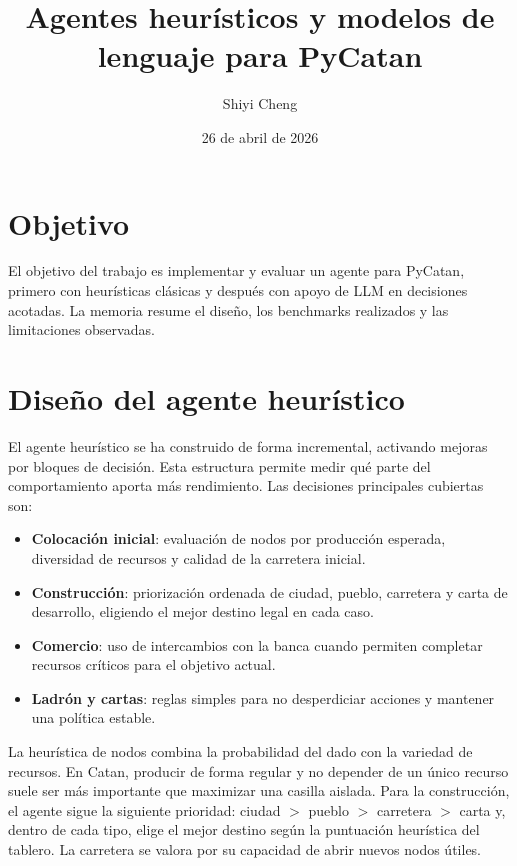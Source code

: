﻿\documentclass[10pt,a4paper]{article}
\title{Agentes heurísticos y modelos de lenguaje para PyCatan}
\author{Shiyi Cheng}
\date{26 de abril de 2026}
\begin{document}
\maketitle

\section{Objetivo}
El objetivo del trabajo es implementar y evaluar un agente para PyCatan, primero con heurísticas clásicas y después con apoyo de LLM en decisiones acotadas. La memoria resume el diseño, los benchmarks realizados y las limitaciones observadas.

\section{Diseño del agente heurístico}
El agente heurístico se ha construido de forma incremental, activando mejoras por bloques de decisión. Esta estructura permite medir qué parte del comportamiento aporta más rendimiento. Las decisiones principales cubiertas son:

\begin{itemize}
\item \textbf{Colocación inicial}: evaluación de nodos por producción esperada, diversidad de recursos y calidad de la carretera inicial.
\item \textbf{Construcción}: priorización ordenada de ciudad, pueblo, carretera y carta de desarrollo, eligiendo el mejor destino legal en cada caso.
\item \textbf{Comercio}: uso de intercambios con la banca cuando permiten completar recursos críticos para el objetivo actual.
\item \textbf{Ladrón y cartas}: reglas simples para no desperdiciar acciones y mantener una política estable.
\end{itemize}

La heurística de nodos combina la probabilidad del dado con la variedad de recursos. En Catan, producir de forma regular y no depender de un único recurso suele ser más importante que maximizar una casilla aislada. Para la construcción, el agente sigue la siguiente prioridad: ciudad $>$ pueblo $>$ carretera $>$ carta y, dentro de cada tipo, elige el mejor destino según la puntuación heurística del tablero. La carretera se valora por su capacidad de abrir nuevos nodos útiles.
\end{document}
